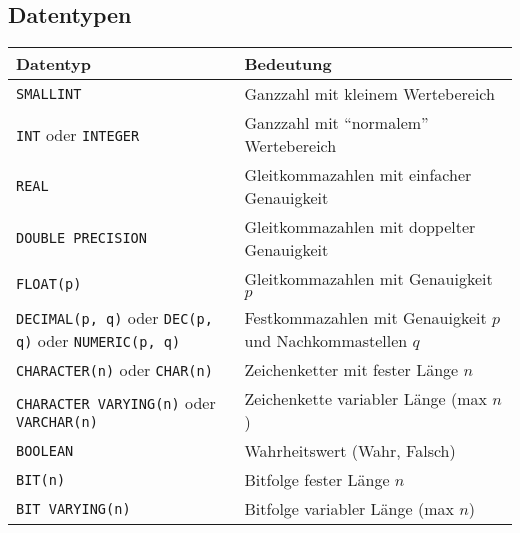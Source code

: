 		\subsection{Datentypen} %
			\begin{table}[H]
				\centering
				\begin{tabular}{l | l}
					Datentyp                                                                            & Bedeutung                                                        \\ \hline
					\lstinline|SMALLINT|                                                                & Ganzzahl mit kleinem Wertebereich                                \\
					\lstinline|INT| oder \lstinline|INTEGER|                                            & Ganzzahl mit \enquote{normalem} Wertebereich                     \\
					\lstinline|REAL|                                                                    & Gleitkommazahlen mit einfacher Genauigkeit                       \\
					\lstinline|DOUBLE PRECISION|                                                        & Gleitkommazahlen mit doppelter Genauigkeit                       \\
					\lstinline|FLOAT(p)|                                                                & Gleitkommazahlen mit Genauigkeit \(p\)                           \\
					\lstinline|DECIMAL(p, q)| oder \lstinline|DEC(p, q)| oder \lstinline|NUMERIC(p, q)| & Festkommazahlen mit Genauigkeit \(p\) und Nachkommastellen \(q\) \\
					\lstinline|CHARACTER(n)| oder \lstinline|CHAR(n)|                                   & Zeichenketter mit fester Länge \(n\)                             \\
					\lstinline|CHARACTER VARYING(n)| oder \lstinline|VARCHAR(n)|                        & Zeichenkette variabler Länge (max \(n\))                         \\
					\lstinline|BOOLEAN|                                                                 & Wahrheitswert (Wahr, Falsch)                                     \\
					\lstinline|BIT(n)|                                                                  & Bitfolge fester Länge \(n\)                                      \\
					\lstinline|BIT VARYING(n)|                                                          & Bitfolge variabler Länge (max \(n\))                             \\

\end{tabular}
\end{table}
